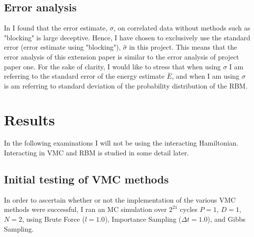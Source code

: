 \documentclass[%
oneside,                 %
final,                   %
10pt]{article}
\begin{document}
\subsection{Error analysis}
In \cite{JN_P1} I found that the error estimate, $\sigma$, on correlated data without methods such as "blocking" is large deceptive. Hence, I have chosen to exclusively use the standard error (error estimate using "blocking"), $\hat \sigma$ in this project. This means that the error analysis of this extension paper is similar to the error analysis of project paper one. For the sake of clarity, I would like to stress that when using $\hat \sigma$ I am referring to the standard error of the energy estimate $\bar E$, and when I am using $ \sigma$ is am referring to standard deviation of the probability distribution of the RBM.

\section{Results} \label{results}
In the following examinations I will not be using the interacting Hamiltonian. Interacting in VMC and RBM is studied in some detail later.
\subsection{Initial testing of VMC methods}
In order to ascertain whether or not the implementation of the various VMC methods were successful, I ran an MC simulation over $2^{21}$ cycles $P=1$, $D=1$, $N=2$, using Brute Force ($l=1.0$), Importance Sampling ($\Delta t=1.0$), and Gibbs Sampling. 
\end{document}
